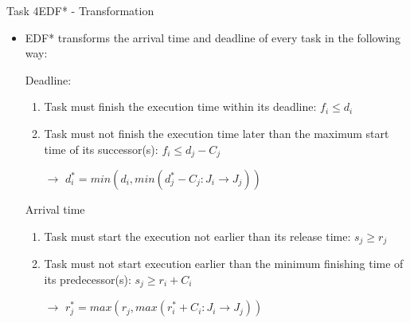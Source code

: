 \begin{frame}[allowframebreaks]{Task 4}{EDF* - Transformation}
\begin{itemize}
    \item EDF* transforms the arrival time and deadline of every task in the following way:
    \item[] \alert{Deadline}: \begin{enumerate}
        \item Task must finish the execution time within its deadline: $f_i \leq d_i$
        \item Task must not finish the execution time later than the maximum start time of its successor(s): $f_i \leq d_j - C_j$
        \item[$\rightarrow$] $d_i^* = min(d_i, min(d_j^* - C_j : J_i \rightarrow J_j))$
    \end{enumerate}
    \framebreak
    \item[] \alert{Arrival time} \begin{enumerate}
        \item Task must start the execution not earlier than its release time: $s_j \geq r_j$
        \item Task must not start execution earlier than the minimum finishing time of its predecessor(s): $s_j \geq r_i + C_i$
        \item[$\rightarrow$] $r_j^* = max(r_j, max(r_i^* + C_i : J_i \rightarrow J_j))$
    \end{enumerate}
\end{itemize}
\end{frame}

\if{}\fi

